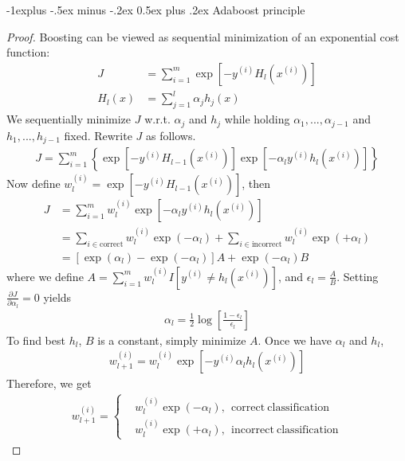 \documentclass[10pt,landscape]{article}
\makeatletter
\renewcommand{\subsection}{\@startsection{subsection}{2}{0mm}%
                                {-1explus -.5ex minus -.2ex}%
                                {0.5ex plus .2ex}%
                                {\normalfont\small\bfseries}}
\makeatother
\begin{document}
\begin{multicols}{3}
\subsection{Adaboost principle}
\begin{proof}
	Boosting can be viewed as sequential minimization of an exponential cost function:
	\begin{align*}
	J &= \sum_{i=1}^m \exp{\left[ -y^{(i)} H_l(x^{(i)}) \right]}\\
	H_l(x) &= \sum_{j=1}^l \alpha_j h_j(x)
	\end{align*}
	We sequentially minimize $J$ w.r.t. $\alpha_j$ and $h_j$ while holding $\alpha_1, ..., \alpha_{j-1}$ and $h_1, ..., h_{j-1}$ fixed. Rewrite $J$ as follows.
	\begin{align*}
	J = \sum_{i=1}^m \left\{ \exp{\left[ -y^{(i)} H_{l-1}(x^{(i)}) \right]} \exp{\left[ -\alpha_l y^{(i)} h_l(x^{(i)}) \right]} \right\}
	\end{align*}
	Now define $w_l^{(i)} = \exp{\left[ -y^{(i)} H_{l-1}(x^{(i)}) \right]}$, then
	\begin{align*}
	J &= \sum_{i=1}^m w_l^{(i)} \exp{\left[ -\alpha_l y^{(i)} h_l(x^{(i)}) \right]}\\
	&= \sum_{i \in \mathrm{correct}} w_l^{(i)} \exp{\left( -\alpha_l \right)} + \sum_{i \in \mathrm{incorrect}} w_l^{(i)} \exp{\left( +\alpha_l \right)}\\
	&= \left[ \exp{\left( \alpha_l \right)} - \exp{\left( -\alpha_l \right)} \right] A + \exp{\left( -\alpha_l \right)} B
	\end{align*}
	where we define $A = \sum_{i=1}^m w_l^{(i)} I \left[ y^{(i)} \neq h_l(x^{(i)}) \right]$, and $\epsilon_l = \frac{A}{B}$. Setting $\frac{\partial J}{\partial \alpha_l} = 0$ yields
	\begin{align*}
	\alpha_l = \frac{1}{2}\log{ \left[ \frac{1 - \epsilon_l}{\epsilon_l} \right] }
	\end{align*}
	To find best $h_l$, $B$ is a constant, simply minimize $A$. Once we have $\alpha_l$ and $h_l$,
	\begin{align*}
	w_{l+1}^{(i)} = w_l^{(i)} \exp{ \left[ -y^{(i)} \alpha_l h_l(x^{(i)}) \right] }
	\end{align*}
	Therefore, we get
	\begin{align*}
	w_{l+1}^{(i)} = \left\{
	\begin{aligned}
	&w_l^{(i)} \exp{\left( -\alpha_l \right)}, \ \ \mathrm{correct \ classification}\\
	&w_l^{(i)} \exp{\left( +\alpha_l \right)}, \ \ \mathrm{incorrect \ classification}
	\end{aligned}
	\right.
	\end{align*}
\end{proof}


\end{multicols}
\end{document}

